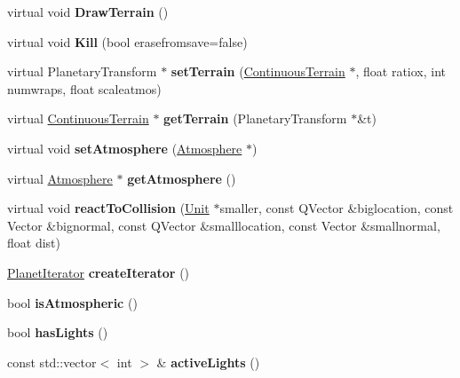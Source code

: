 \begin{DoxyCompactItemize}
\item 
virtual void {\bfseries Draw\+Terrain} ()\hypertarget{classPlanet_ae4e523af67c79b004e7c0709269b3bca}{}\label{classPlanet_ae4e523af67c79b004e7c0709269b3bca}

\item 
virtual void {\bfseries Kill} (bool erasefromsave=false)\hypertarget{classPlanet_a6d4998bdd90fe865d7e48dd0c97ded9d}{}\label{classPlanet_a6d4998bdd90fe865d7e48dd0c97ded9d}

\item 
virtual Planetary\+Transform $\ast$ {\bfseries set\+Terrain} (\hyperlink{classContinuousTerrain}{Continuous\+Terrain} $\ast$, float ratiox, int numwraps, float scaleatmos)\hypertarget{classPlanet_a5c75de9900c8c0373b9a550f9346d071}{}\label{classPlanet_a5c75de9900c8c0373b9a550f9346d071}

\item 
virtual \hyperlink{classContinuousTerrain}{Continuous\+Terrain} $\ast$ {\bfseries get\+Terrain} (Planetary\+Transform $\ast$\&t)\hypertarget{classPlanet_a60a27bd5220404fd7bdadf1246ab7b9b}{}\label{classPlanet_a60a27bd5220404fd7bdadf1246ab7b9b}

\item 
virtual void {\bfseries set\+Atmosphere} (\hyperlink{classAtmosphere}{Atmosphere} $\ast$)\hypertarget{classPlanet_a4061b310820c98351a025e43bc4f5bc1}{}\label{classPlanet_a4061b310820c98351a025e43bc4f5bc1}

\item 
virtual \hyperlink{classAtmosphere}{Atmosphere} $\ast$ {\bfseries get\+Atmosphere} ()\hypertarget{classPlanet_a252b701a5b22a74e60ee568937849ae6}{}\label{classPlanet_a252b701a5b22a74e60ee568937849ae6}

\item 
virtual void {\bfseries react\+To\+Collision} (\hyperlink{classUnit}{Unit} $\ast$smaller, const Q\+Vector \&biglocation, const Vector \&bignormal, const Q\+Vector \&smalllocation, const Vector \&smallnormal, float dist)\hypertarget{classPlanet_a28b3366aa1df062393bd76010066a703}{}\label{classPlanet_a28b3366aa1df062393bd76010066a703}

\item 
\hyperlink{classPlanet_1_1PlanetIterator}{Planet\+Iterator} {\bfseries create\+Iterator} ()\hypertarget{classPlanet_abf6c705d284c0ce0d14769f9e285e310}{}\label{classPlanet_abf6c705d284c0ce0d14769f9e285e310}

\item 
bool {\bfseries is\+Atmospheric} ()\hypertarget{classPlanet_a5ff449361270e8b15acc6e868010f41d}{}\label{classPlanet_a5ff449361270e8b15acc6e868010f41d}

\item 
bool {\bfseries has\+Lights} ()\hypertarget{classPlanet_a2acdf8f8d6d413bc169c8d2f9b609304}{}\label{classPlanet_a2acdf8f8d6d413bc169c8d2f9b609304}

\item 
const std\+::vector$<$ int $>$ \& {\bfseries active\+Lights} ()\hypertarget{classPlanet_a6c06067e470625ba65fb5c030ec3b600}{}\label{classPlanet_a6c06067e470625ba65fb5c030ec3b600}

\end{DoxyCompactItemize}
